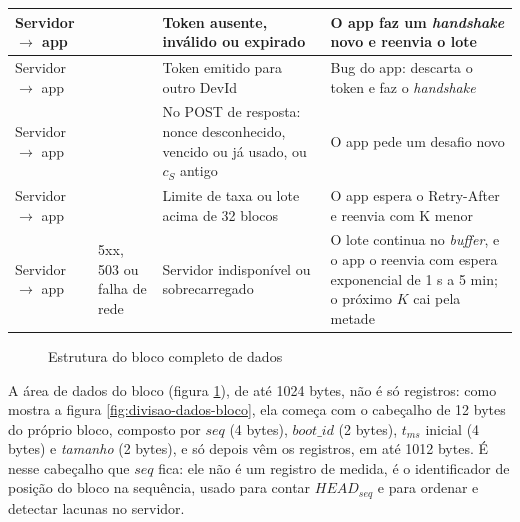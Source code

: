 \documentclass[
	12pt,
	article,			%
	oneside,
	a4paper,
	english,
	brazil				%
	]{abntex2}
\begin{document}
\begin{longtable}{|>{\raggedright\arraybackslash}p{}|>{\raggedright\arraybackslash}p{}|>{\raggedright\arraybackslash}p{}|>{\raggedright\arraybackslash}p{}|}
	\hline
	Servidor $\rightarrow$ app & 401 & Token ausente, inválido ou expirado & O app faz um \textit{handshake} novo e reenvia o lote \\
	\hline
	Servidor $\rightarrow$ app & 403 & Token emitido para outro DevId & Bug do app: descarta o token e faz o \textit{handshake} \\
	\hline
	Servidor $\rightarrow$ app & 409 & No POST de resposta: nonce desconhecido, vencido ou já usado, ou $c_S$ antigo & O app pede um desafio novo \\
	\hline
	Servidor $\rightarrow$ app & 429 & Limite de taxa ou lote acima de 32 blocos & O app espera o Retry-After e reenvia com K menor \\
	\hline
	Servidor $\rightarrow$ app & 5xx, 503 ou falha de rede & Servidor indisponível ou sobrecarregado & O lote continua no \textit{buffer}, e o app o reenvia com espera exponencial de 1 s a 5 min; o próximo $K$ cai pela metade \\
\end{longtable}

\begin{figure}[H]
	\centering
	\caption{Estrutura do bloco completo de dados}
	\label{fig:bloco-completo}
\end{figure}

A área de dados do bloco (figura \ref{fig:bloco-completo}), de até 1024 bytes, não é só registros: como mostra a figura \ref{fig:divisao-dados-bloco}, ela começa com o cabeçalho de 12 bytes do próprio
bloco, composto por $seq$ (4 bytes), $boot\_id$ (2 bytes), $t_{ms}$ inicial (4 bytes) e \textit{tamanho} (2 bytes), e só depois vêm os registros, em até 1012 bytes. É nesse cabeçalho que $seq$ fica: ele não é um
registro de medida, é o identificador de posição do bloco na sequência, usado para contar $HEAD_{seq}$ e para ordenar e detectar lacunas no servidor.
\end{document}
